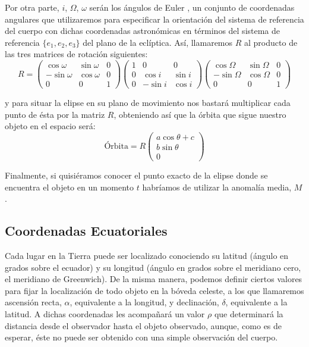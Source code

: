 \documentclass[11pt]{book}
\begin{document}
Por otra parte, $i$, $\Omega$, $\omega$ serán los ángulos de Euler \cite{euler_angles}, un conjunto de coordenadas angulares que utilizaremos para especificar la orientación del sistema de referencia del cuerpo con dichas coordenadas astronómicas en términos del sistema de referencia $\{e_1,e_2,e_3\}$ del plano de la eclíptica. Así, llamaremos $R$ al producto de las tres matrices de rotación siguientes:
\[
R=
\left(
\begin{array}{ccc}
	\cos{\omega} & \sin{\omega} & 0 \\
	-\sin{\omega} & \cos{\omega} & 0 \\
	0 & 0 & 1
\end{array}
\right)
\left(
\begin{array}{ccc}
	1 & 0 & 0 \\
	0 & \cos{i} & \sin{i} \\
	0 & -\sin{i} & \cos{i}
\end{array}
\right)
\left(
\begin{array}{ccc}
	\cos{\Omega} & \sin{\Omega} & 0 \\
	-\sin{\Omega} & \cos{\Omega} & 0 \\
	0 & 0 & 1
\end{array}
\right)
\]

\noindent y para situar la elipse en su plano de movimiento nos bastará multiplicar cada punto de ésta por la matriz $R$, obteniendo así que la órbita que sigue nuestro objeto en el espacio será:
\[
\text{Órbita}=R
\left(
\begin{array}{c}
a\cos{\theta}+c \\ b\sin{\theta} \\ 0
\end{array}
\right)
\]

Finalmente, si quisiéramos conocer el punto exacto de la elipse donde se encuentra el objeto en un momento $t$ habríamos de utilizar la anomalía media, $M$.\\


\subsection{Coordenadas Ecuatoriales}
\label{subsec:equatorial_coordinates}
Cada lugar en la Tierra puede ser localizado conociendo su latitud (ángulo en grados sobre el ecuador) y su longitud (ángulo en grados sobre el meridiano cero, el meridiano de Greenwich). De la misma manera, podemos definir ciertos valores para fijar la localización de todo objeto en la bóveda celeste, a los que llamaremos ascensión recta, $\alpha$, equivalente a la longitud, y declinación, $\delta$, equivalente a la latitud. A dichas coordenadas les acompañará un valor $\rho$ que determinará la distancia desde el observador hasta el objeto observado, aunque, como es de esperar, éste no puede ser obtenido con una simple observación del cuerpo.\\
\end{document}
